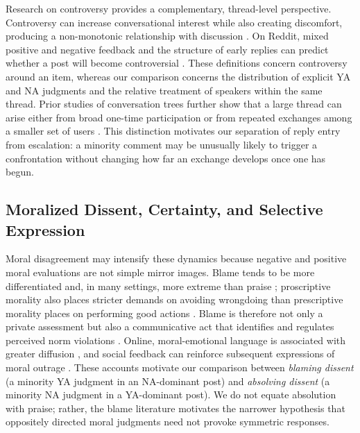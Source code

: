 Research on controversy provides a complementary, thread-level perspective. Controversy can increase conversational interest while also creating discomfort, producing a non-monotonic relationship with discussion \cite{chen2013controversy}. On Reddit, mixed positive and negative feedback and the structure of early replies can predict whether a post will become controversial \cite{hessel2019brewing}. These definitions concern controversy around an item, whereas our comparison concerns the distribution of explicit YA and NA judgments and the relative treatment of speakers within the same thread. Prior studies of conversation trees further show that a large thread can arise either from broad one-time participation or from repeated exchanges among a smaller set of users \cite{backstrom2013threads,choi2015reddit}. This distinction motivates our separation of reply entry from escalation: a minority comment may be unusually likely to trigger a confrontation without changing how far an exchange develops once one has begun.

\subsection{Moralized Dissent, Certainty, and Selective Expression}

Moral disagreement may intensify these dynamics because negative and positive moral evaluations are not simple mirror images. Blame tends to be more differentiated and, in many settings, more extreme than praise \cite{guglielmo2019asymmetric}; proscriptive morality also places stricter demands on avoiding wrongdoing than prescriptive morality places on performing good actions \cite{janoffbulman2009proscriptive}. Blame is therefore not only a private assessment but also a communicative act that identifies and regulates perceived norm violations \cite{malle2014blame}. Online, moral-emotional language is associated with greater diffusion \cite{brady2017emotion}, and social feedback can reinforce subsequent expressions of moral outrage \cite{brady2021social}. These accounts motivate our comparison between \emph{blaming dissent} (a minority YA judgment in an NA-dominant post) and \emph{absolving dissent} (a minority NA judgment in a YA-dominant post). We do not equate absolution with praise; rather, the blame literature motivates the narrower hypothesis that oppositely directed moral judgments need not provoke symmetric responses.

